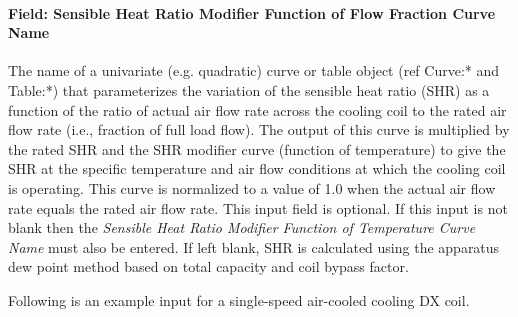 \paragraph{Field: Sensible Heat Ratio Modifier Function of Flow Fraction Curve Name}\label{field-sensible-heat-ratio-modifier-function-of-flow-fraction-curve-name}

The name of a univariate (e.g. quadratic) curve or table object (ref Curve:* and Table:*) that parameterizes the variation of the sensible heat ratio (SHR) as a function of the ratio of actual air flow rate across the cooling coil to the rated air flow rate (i.e., fraction of full load flow). The output of this curve is multiplied by the rated SHR and the SHR modifier curve (function of temperature) to give the SHR at the specific temperature and air flow conditions at which the cooling coil is operating. This curve is normalized to a value of 1.0 when the actual air flow rate equals the rated air flow rate. This input field is optional. If this input is not blank then the \textit{Sensible Heat Ratio Modifier Function of Temperature Curve Name} must also be entered. If left blank, SHR is calculated using the apparatus dew point method based on total capacity and coil bypass factor.

Following is an example input for a single-speed air-cooled cooling DX coil.

